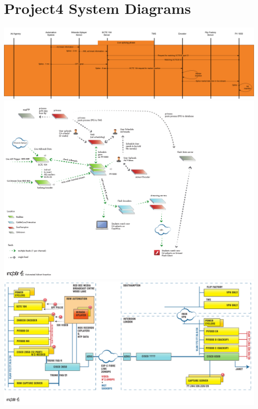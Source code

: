 \section{Project4 System Diagrams}

\includegraphics[angle=90,scale=0.2]{resources/P4_Event_Flow.png}
\label{Project4EventFlow}
\newpage
\includegraphics[scale=0.35]{resources/P4_System_Overview.pdf}
\label{Project4System}
\newpage
\includegraphics[angle=90,scale=0.55]{resources/P4_Server_Config.pdf}\\
\label{Project4Server}